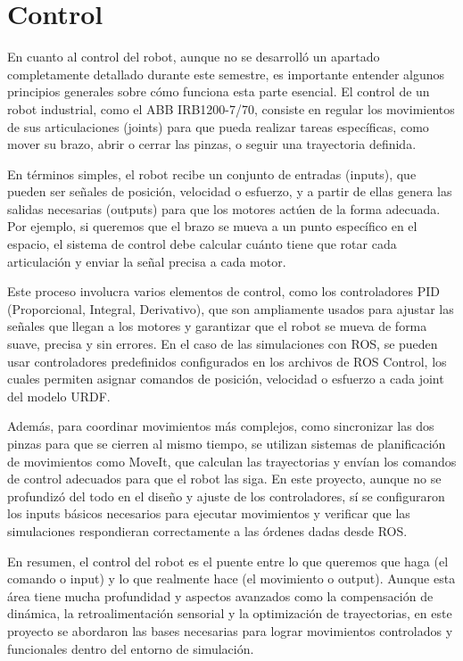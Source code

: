 \section{Control} \label{sec:control}
En cuanto al control del robot, aunque no se desarrolló un apartado completamente detallado durante este semestre, es importante entender algunos principios generales sobre cómo funciona esta parte esencial. El control de un robot industrial, como el ABB IRB1200-7/70, consiste en regular los movimientos de sus articulaciones (joints) para que pueda realizar tareas específicas, como mover su brazo, abrir o cerrar las pinzas, o seguir una trayectoria definida.

En términos simples, el robot recibe un conjunto de entradas (inputs), que pueden ser señales de posición, velocidad o esfuerzo, y a partir de ellas genera las salidas necesarias (outputs) para que los motores actúen de la forma adecuada. Por ejemplo, si queremos que el brazo se mueva a un punto específico en el espacio, el sistema de control debe calcular cuánto tiene que rotar cada articulación y enviar la señal precisa a cada motor.

Este proceso involucra varios elementos de control, como los controladores PID (Proporcional, Integral, Derivativo), que son ampliamente usados para ajustar las señales que llegan a los motores y garantizar que el robot se mueva de forma suave, precisa y sin errores. En el caso de las simulaciones con ROS, se pueden usar controladores predefinidos configurados en los archivos de ROS Control, los cuales permiten asignar comandos de posición, velocidad o esfuerzo a cada joint del modelo URDF.

Además, para coordinar movimientos más complejos, como sincronizar las dos pinzas para que se cierren al mismo tiempo, se utilizan sistemas de planificación de movimientos como MoveIt, que calculan las trayectorias y envían los comandos de control adecuados para que el robot las siga. En este proyecto, aunque no se profundizó del todo en el diseño y ajuste de los controladores, sí se configuraron los inputs básicos necesarios para ejecutar movimientos y verificar que las simulaciones respondieran correctamente a las órdenes dadas desde ROS.

En resumen, el control del robot es el puente entre lo que queremos que haga (el comando o input) y lo que realmente hace (el movimiento o output). Aunque esta área tiene mucha profundidad y aspectos avanzados como la compensación de dinámica, la retroalimentación sensorial y la optimización de trayectorias, en este proyecto se abordaron las bases necesarias para lograr movimientos controlados y funcionales dentro del entorno de simulación. \cite{introduccionRobotica}

